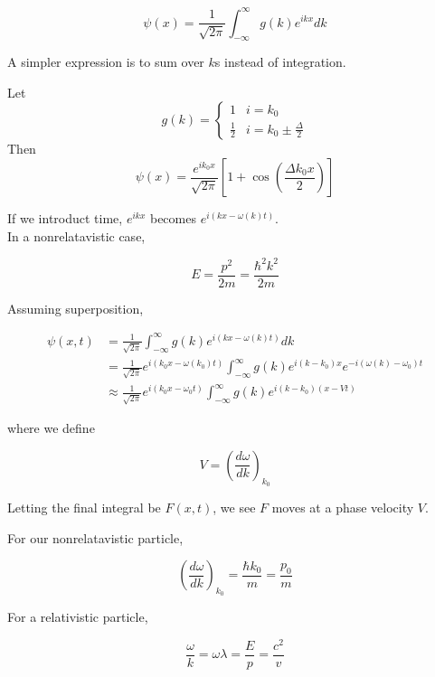 \documentclass[12pt]{article}
\begin{document}
\begin{equation}
    \psi(x) = \frac{1}{\sqrt{2\pi}} \int_{-\infty}^\infty g(k)e^{ikx}dk
\end{equation}

A simpler expression is to sum over $k$s instead of integration.

\begin{ex}
    Let
    $$g(k) = \begin{cases} 1 & i = k_0 \\ \frac{1}{2} & i = k_0 \pm \frac{\Delta}{2} \end{cases}$$
    Then
    $$\psi(x) = \frac{e^{ik_0x}}{\sqrt{2\pi}}\left[1 + \cos\left(\frac{\Delta k_0x}{2}\right)\right]$$
\end{ex}

If we introduct time, $e^{ikx}$ becomes $e^{i(kx - \omega(k)t)}$. \\
In a nonrelatavistic case,

\begin{equation}
    E = \frac{p^2}{2m} = \frac{\hbar^2k^2}{2m}
\end{equation}

Assuming superposition,

\begin{align*}
    \psi(x,t) &= \frac{1}{\sqrt{2\pi}} \int_{-\infty}^\infty g(k)e^{i(kx - \omega(k)t)}dk \\
              &= \frac{1}{\sqrt{2\pi}} e^{i(k_0x - \omega(k_0)t)} \int_{-\infty}^\infty g(k)e^{i(k-k_0)x}e^{-i(\omega(k) - \omega_0)t} \\
              &\approx \frac{1}{\sqrt{2\pi}} e^{i(k_0x - \omega_0 t)} \int_{-\infty}^\infty g(k) e^{i(k-k_0)(x - Vt)}
\end{align*}

where we define

\begin{equation}
    V = \left(\frac{d\omega}{dk}\right)_{k_0}
\end{equation}

Letting the final integral be $F(x,t)$, we see $F$ moves at a phase velocity $V$.

For our nonrelatavistic particle,

\begin{equation}
    \left(\frac{d\omega}{dk}\right)_{k_0} = \frac{\hbar k_0}{m} = \frac{p_0}{m}
\end{equation}

For a relativistic particle,

\begin{equation}
    \frac{\omega}{k} = \omega\lambda = \frac{E}{p} = \frac{c^2}{v}
\end{equation}
\end{document}
